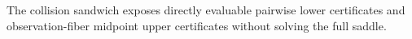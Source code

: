 The collision sandwich exposes directly evaluable pairwise lower certificates and observation-fiber midpoint upper certificates without solving the full saddle.